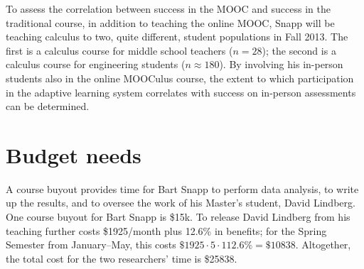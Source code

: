\documentclass[12pt]{article}
\begin{document}
To assess the correlation between success in the MOOC and success in
the traditional course, in addition to teaching the online MOOC, Snapp
will be teaching calculus to two, quite different, student populations
in Fall 2013.  The first is a calculus course for middle school
teachers ($n=28$); the second is a calculus course for engineering
students ($n\approx 180$).  By involving his in-person students also
in the online MOOCulus course, the extent to which participation in
the adaptive learning system correlates with success on in-person
assessments can be determined.

\section{Budget needs}

A course buyout provides time for Bart Snapp to perform data analysis,
to write up the results, and to oversee the work of his Master's
student, David Lindberg.  One course buyout for Bart Snapp is \$15k.
To release David Lindberg from his teaching further costs \$1925/month
plus 12.6\% in benefits; for the Spring Semester from January--May,
this costs $\$1925 \cdot 5 \cdot 112.6\% = \$10838$.  Altogether, the
total cost for the two researchers' time is \$25838.

\printbibliography
\end{document}
